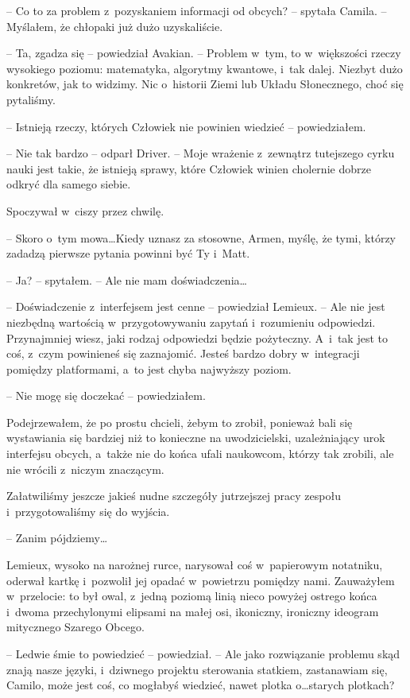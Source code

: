 \documentclass[oneside,polish,12pt,sfheadings]{mwbk}
\begin{document}
-- Co to za problem z~pozyskaniem informacji od obcych? -- spytała Camila. -- Myślałem, że chłopaki już dużo uzyskaliście.

-- Ta, zgadza się -- powiedział Avakian. -- Problem w~tym, to w~większości
rzeczy wysokiego poziomu: matematyka, algorytmy kwantowe, i~tak dalej. Niezbyt dużo konkretów, jak to widzimy. Nic o~historii Ziemi lub Układu
Słonecznego, choć się pytaliśmy.

-- Istnieją rzeczy, których Człowiek nie powinien wiedzieć --
powiedziałem.

-- Nie tak bardzo -- odparł Driver. -- Moje wrażenie z~zewnątrz tutejszego
cyrku nauki jest takie, że istnieją sprawy, które Człowiek winien
cholernie dobrze odkryć dla samego siebie.

Spoczywał w~ciszy przez chwilę. 

-- Skoro o~tym mowa\ldots Kiedy uznasz za
stosowne, Armen, myślę, że tymi, którzy zadadzą pierwsze pytania powinni
być Ty i~Matt.

-- Ja? -- spytałem. -- Ale nie mam doświadczenia\ldots

-- Doświadczenie z~interfejsem jest cenne -- powiedział Lemieux. -- Ale nie
jest niezbędną wartością w~przygotowywaniu zapytań i~rozumieniu
odpowiedzi. Przynajmniej wiesz, jaki rodzaj odpowiedzi będzie
pożyteczny. A~i~tak jest to coś, z~czym powinieneś się zaznajomić.
Jesteś bardzo dobry w~integracji pomiędzy platformami, a~to jest chyba
najwyższy poziom.

-- Nie mogę się doczekać -- powiedziałem.

Podejrzewałem, że po prostu chcieli, żebym to zrobił, ponieważ bali się
wystawiania się bardziej niż to konieczne na uwodzicielski,
uzależniający urok interfejsu obcych, a~także nie do końca ufali
naukowcom, którzy tak zrobili, ale nie wrócili z~niczym znaczącym.

Załatwiliśmy jeszcze jakieś nudne szczegóły jutrzejszej pracy zespołu i~przygotowaliśmy się do wyjścia.

-- Zanim pójdziemy\ldots

Lemieux, wysoko na narożnej rurce, narysował coś w~papierowym notatniku,
oderwał kartkę i~pozwolił jej opadać w~powietrzu pomiędzy nami.
Zauważyłem w~przelocie: to był owal, z~jedną poziomą linią nieco powyżej
ostrego końca i~dwoma przechylonymi elipsami na małej osi, ikoniczny,
ironiczny ideogram mitycznego Szarego Obcego.

-- Ledwie śmie to powiedzieć -- powiedział. -- Ale jako rozwiązanie
problemu skąd znają nasze języki, i~dziwnego projektu sterowania
statkiem, zastanawiam się, Camilo, może jest coś, co mogłabyś wiedzieć,
nawet plotka o\ldots starych plotkach?
\end{document}
